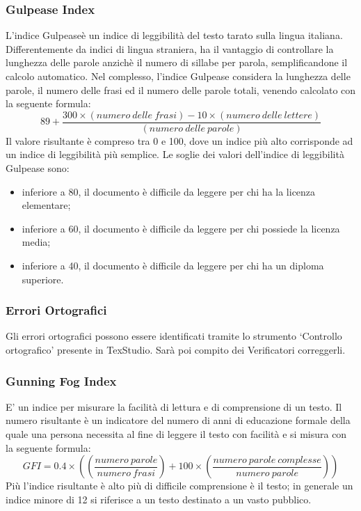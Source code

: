 		\subsubsection{Gulpease Index} L’indice Gulpease\pedice è un indice di leggibilità del testo tarato sulla
		lingua italiana. Differentemente da indici di lingua straniera, ha il vantaggio di controllare
la lunghezza delle parole anzichè il numero di sillabe per parola, semplificandone il calcolo
automatico.
		Nel complesso, l’indice Gulpease considera la lunghezza delle parole, il numero delle frasi
ed il numero delle parole totali, venendo calcolato con la seguente formula:\newline
		\[
		 	89+\frac{300 \times (numero ~delle ~frasi) - 10 \times (numero ~delle ~lettere)}{(numero ~delle ~parole)}
		\]\newline	
		Il valore risultante è compreso tra 0 e 100, dove un indice più alto corrisponde ad un
indice di leggibilità più semplice.
		Le soglie dei valori dell’indice di leggibilità Gulpease sono:
		\begin{itemize}
			\item inferiore a 80, il documento è difficile da leggere per chi ha la licenza elementare;
			\item  inferiore a 60, il documento è difficile da leggere per chi possiede la licenza media;
			\item inferiore a 40, il documento è difficile da leggere per chi ha un diploma superiore.
			\newline
		\end{itemize}
		\subsubsection{Errori Ortografici} Gli errori ortografici possono essere identificati tramite lo strumento ‘Controllo
ortografico’ presente in TexStudio. Sarà poi compito dei Verificatori correggerli.
\newline
		\subsubsection{Gunning Fog Index} E' un indice per misurare la facilità di lettura e di comprensione di un testo. Il numero risultante è un indicatore del numero di anni di educazione formale della quale una persona necessita al fine di leggere il testo con facilità e si misura con la seguente formula:\newline
		\[
		GFI=0.4\times((\frac{numero ~parole}{numero ~frasi})+100\times(\frac{numero ~parole ~complesse}{numero ~parole}))
		\]\newline
		Più l'indice risultante è alto più di difficile comprensione è il testo; in generale un indice minore di 12 si riferisce a un testo destinato a un vasto pubblico.
